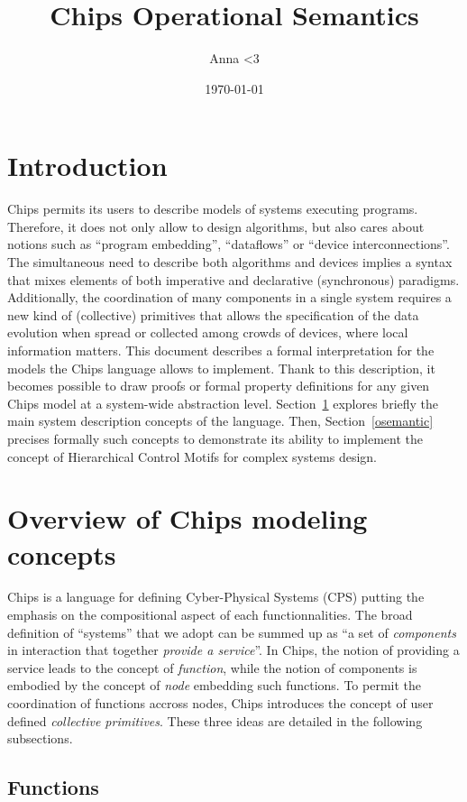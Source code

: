 \documentclass{article}
\title{Chips Operational Semantics}
\author{Anna <3}
\date{\today}
\begin{document}
\maketitle

\section*{Introduction}
Chips permits its users to describe models of systems executing programs. Therefore, it does not only allow to design algorithms, but also cares about notions such as ``program embedding'', ``dataflows'' or ``device interconnections''. The simultaneous need to describe both algorithms and devices implies a syntax that mixes elements of both imperative and declarative (synchronous) paradigms. Additionally, the coordination of many components in a single system requires a new kind of (collective) primitives that allows the specification of the data evolution when spread or collected among crowds of devices, where local information matters.
This document describes a formal interpretation for the models the Chips language allows to implement. Thank to this description, it becomes possible to draw proofs or formal property definitions for any given Chips model at a system-wide abstraction level.
Section~\ref{overview} explores briefly the main system description concepts of the language. Then, Section~\ref{osemantic} precises formally such concepts to demonstrate its ability to implement the concept of Hierarchical Control Motifs for complex systems design.

\section{Overview of Chips modeling concepts}\label{overview}

Chips is a language for defining Cyber-Physical Systems (CPS) putting the emphasis on the compositional aspect of each functionnalities. The broad definition of ``systems'' that we adopt can be summed up as ``a set of \emph{components} in interaction that together \emph{provide a service}''. 
In Chips, the notion of providing a service leads to the concept of \emph{function}, while the notion of components is embodied by the concept of \emph{node} embedding such functions. To permit the coordination of functions accross nodes, Chips introduces the concept of user defined \emph{collective primitives}.
These three ideas are detailed in the following subsections. 

\subsection{Functions}\label{functions}
\end{document}
